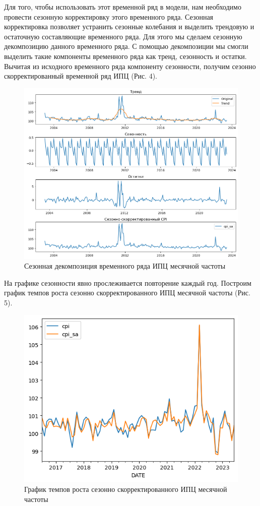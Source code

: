 \documentclass[a4paper, 12pt]{extarticle}
\begin{document}
	Для того, чтобы использовать этот временной ряд в модели, нам необходимо провести сезонную корректировку этого временного ряда. Сезонная корректировка позволяет устранить сезонные колебания и выделить трендовую и остаточную составляющие временного ряда. Для этого мы сделаем сезонную декомпозицию данного временного ряда. С помощью декомпозиции мы смогли выделить такие компоненты временного ряда как тренд, сезонность и остатки. Вычитая из исходного временного ряда компоненту сезонности, получим сезонно скорректированный временной ряд ИПЦ (Рис. 4).
	\begin{figure}[tph!]
		\centering
		\includegraphics[scale=0.5]{images/pic_04}
		\caption[Рис. 4]{Сезонная декомпозиция временного ряда ИПЦ месячной частоты}
		\label{fig:pic04}
	\end{figure}
	
	На графике сезонности явно прослеживается повторение каждый год.
	Построим график темпов роста сезонно скорректированного ИПЦ месячной частоты (Рис. 5).
	
	\begin{figure}[bph!]
		\centering
		\includegraphics[scale=0.8]{images/pic_05}
		\caption[Рис. 5]{График темпов роста сезонно скорректированного ИПЦ месячной частоты}
		\label{fig:pic05}
	\end{figure}
	
\end{document}
